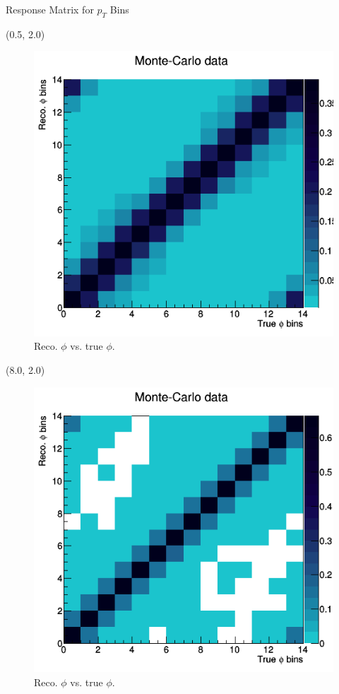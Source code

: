 \documentclass[10pt, xcolor={dvipsnames}, aspectratio = 169]{beamer}
\begin{document}
%
%
%
\begin{frame}{Response Matrix for $p_{T}$ Bins}

\begin{textblock}{7.0}(0.5, 2.0)
\begin{figure}
    \centering
    \includegraphics[width = 1.0\linewidth]{imgs/matrix_pt0.png}
    \caption{Reco. $\phi$ vs. true $\phi$.}
\end{figure}
\end{textblock}

\begin{textblock}{7.0}(8.0, 2.0)
\begin{figure}
    \centering
    \includegraphics[width = 1.0\linewidth]{imgs/matrix_pt1.png}
    \caption{Reco. $\phi$ vs. true $\phi$.}
\end{figure}
\end{textblock}


\end{frame}
\end{document}
